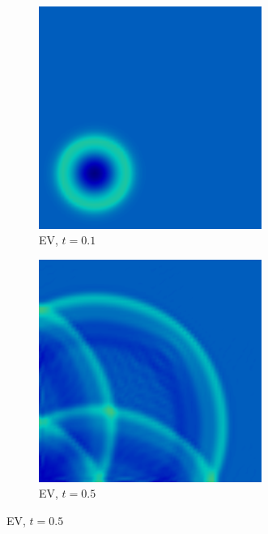 \begin{frame}
\begin{figure}[h]
\begin{subfigure}{0.3\textwidth}
      \includegraphics[width=0.8\textwidth]{./figures/bathtub_EV_t01.png}
      \caption{EV, $t=0.1$}
   \end{subfigure}
   \begin{subfigure}{0.3\textwidth}
      \centering
      \includegraphics[width=0.8\textwidth]{./figures/bathtub_EV_t05.png}
      \caption{EV, $t=0.5$}
   \end{subfigure}
\end{figure}

\end{frame}
